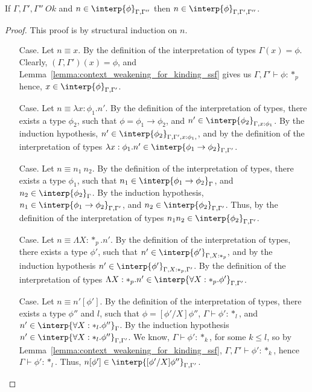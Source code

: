 \begin{lemma}
  If $\Gamma,\Gamma',\Gamma''\ Ok$ and $n \in \interp{\phi}_{\Gamma,\Gamma''}$ then 
  $n \in \interp{\phi}_{\Gamma,\Gamma',\Gamma''}$.
  \label{lemma:context_weakening_interpretations_ssf}
\end{lemma}
\begin{proof}
  This proof is by structural induction on $n$.
\begin{itemize}
\item[Case.]  Let $n \equiv x$.  By the definition of the interpretation of types 
  $\Gamma(x) = \phi$.  Clearly,
  $(\Gamma,\Gamma')(x) = \phi$, and Lemma~\ref{lemma:context_weakening_for_kinding_ssf} gives 
  us $\Gamma,\Gamma' \vdash \phi:*_p$ hence, $x \in \interp{\phi}_{\Gamma,\Gamma'}$.
  
\item[Case.]  Let $n \equiv \lambda x:\phi_1.n'$.  By the definition of the interpretation of 
  types, there exists a type $\phi_2$, such that $\phi = \phi_1 \rightarrow \phi_2$, and 
  $n' \in \interp{\phi_2}_{\Gamma,x:\phi_1}$.  By
  the induction hypothesis, $n' \in \interp{\phi_2}_{\Gamma,\Gamma',x:\phi_1,}$, and by the 
  definition of the interpretation of types 
  $\lambda x:\phi_1.n' \in \interp{\phi_1 \rightarrow \phi_2}_{\Gamma,\Gamma'}$.
  
\item[Case.]  Let $n \equiv n_1\ n_2$.  By the definition of the interpretation of types, there 
  exists a type $\phi_1$, such that 
  $n_1 \in \interp{\phi_1 \rightarrow \phi_2}_\Gamma$, and $n_2 \in \interp{\phi_2}_\Gamma$.  By 
  the induction hypothesis,
  $n_1 \in \interp{\phi_1 \rightarrow \phi_2}_{\Gamma,\Gamma'}$, and 
  $n_2 \in \interp{\phi_2}_{\Gamma,\Gamma'}$.  Thus, by
  the definition of the interpretation of types $n_1n_2 \in \interp{\phi_2}_{\Gamma,\Gamma'}$.
  
\item[Case.]  Let $n \equiv \Lambda X:*_p.n'$.  By the definition of the interpretation of 
  types, there exists a type $\phi'$, such that
  $n' \in \interp{\phi'}_{\Gamma,X:*_p}$, and by the induction hypothesis 
  $n' \in \interp{\phi'}_{\Gamma,X:*_p,\Gamma'}$.  By the
  definition of the interpretation of types 
  $\Lambda X:*_p.n' \in \interp{\forall X:*_p.\phi'}_{\Gamma,\Gamma'}$.
  
\item[Case.]  Let $n \equiv n'[\phi']$.  By the definition of the interpretation of types, 
  there exists a type $\phi''$ and $l$, 
  such that $\phi = [\phi'/X]\phi''$, $\Gamma \vdash \phi':*_l$, and 
  $n' \in \interp{\forall X:*_l.\phi''}_{\Gamma}$.  By the induction
  hypothesis $n' \in \interp{\forall X:*_l.\phi''}_{\Gamma,\Gamma'}$.  We know, 
  $\Gamma \vdash \phi':*_k$, for some $k \leq l$, so by
  Lemma~\ref{lemma:context_weakening_for_kinding_ssf}, $\Gamma,\Gamma' \vdash \phi':*_k$, 
  hence 
  $\Gamma \vdash \phi':*_l$. Thus, $n[\phi'] \in
  \interp{[\phi'/X]\phi''}_{\Gamma,\Gamma'}$.
\end{itemize}
\end{proof}
